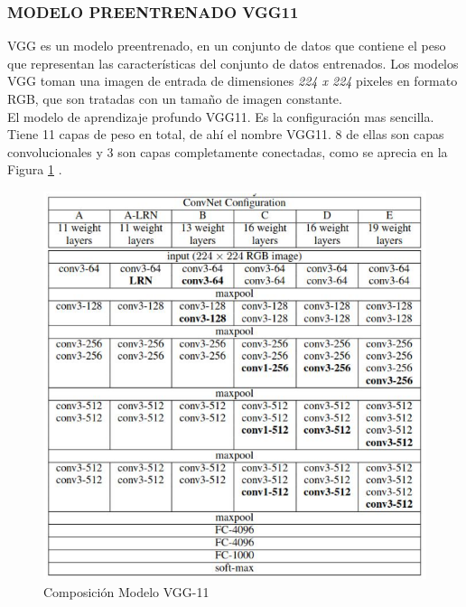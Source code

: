 			\newpage
			\subsubsection{\MakeUppercase{Modelo preentrenado VGG11}}
			VGG es un modelo preentrenado, en un conjunto de datos que contiene el peso que representan las características del conjunto de datos entrenados. Los modelos VGG toman una imagen de entrada de dimensiones \textit{224 x 224} pixeles en formato RGB, que son tratadas con un tamaño de imagen constante.
			\\
			 El modelo de aprendizaje profundo VGG11. Es la configuración mas sencilla. Tiene 11 capas de peso en total, de ahí el nombre VGG11. 8 de ellas son capas convolucionales y 3 son capas completamente conectadas, como se aprecia en la Figura \ref{fig:VGG11} \cite{ref_3}.
			
			\begin{figure}[ht]
				\centering
				\includegraphics[scale=0.8]{Figs/70.png}
				\caption{Composición Modelo VGG-11}
				\label{fig:VGG11}
			\end{figure}
		
